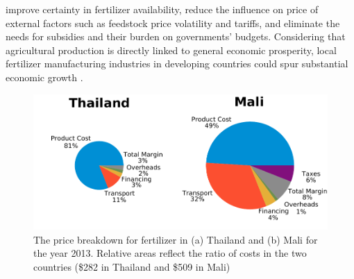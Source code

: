 improve certainty in fertilizer availability, reduce the influence on price of external factors such as feedstock price volatility and tariffs, and eliminate the needs for subsidies and their burden on governments’ budgets. Considering that agricultural production is directly linked to general economic prosperity, local fertilizer manufacturing industries in developing countries could spur substantial economic growth \cite{McArthur_2017}.




\begin{figure}
    \centering
    \includegraphics[width=1\textwidth]{Figures/Cost_Breakdown.pdf}
    \caption{The price breakdown for fertilizer in (a) Thailand and (b) Mali for the year 2013. Relative areas reflect the ratio of costs in the two countries (\$282 in Thailand and  \$509 in Mali) \cite{Wanzala2013}}
    \label{fig:cost_pies}
\end{figure}





